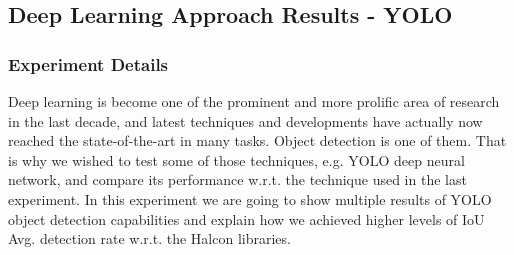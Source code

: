 %

\subsection{Deep Learning Approach Results - YOLO}\label{subsec:yolo_obj_det_results}
\subsubsection{Experiment Details}
Deep learning is become one of the prominent and more prolific area of research in the last decade, and latest techniques and developments have actually now reached the state-of-the-art in many tasks. Object detection is one of them. That is why we wished to test some of those techniques, e.g. YOLO deep neural network, and compare its performance w.r.t. the technique used in the last experiment. In this experiment we are going to show multiple results of YOLO object detection capabilities and explain how we achieved higher levels of IoU Avg. detection rate w.r.t. the Halcon libraries.

